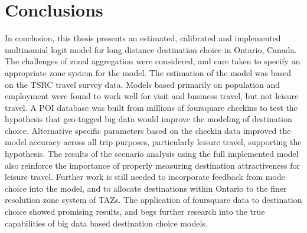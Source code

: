 \section{Conclusions}
In conclusion, this thesis presents an estimated, calibrated and implemented multinomial logit model for long distance destination choice in Ontario, Canada. The challenges of zonal aggregation were considered, and care taken to specify an appropriate zone system for the model. The estimation of the model was based on the TSRC travel survey data. Models based primarily on population and employment were found to work well for visit and business travel, but not leisure travel. A POI database was built from millions of foursquare checkins to test the hypothesis that geo-tagged big data would improve the modeling of destination choice. Alternative specific parameters based on the checkin data improved the model accuracy across all trip purposes, particularly leisure travel, supporting the hypothesis. The results of the scenario analysis using the full implemented model also reinforce the importance of properly measuring destination attractiveness for leisure travel. Further work is still needed to incorporate feedback from mode choice into the model, and to allocate destinations within Ontario to the finer resolution zone system of TAZs. The application of foursquare data to destination choice showed promising results, and begs further research into the true capabilities of big data based destination choice models.

